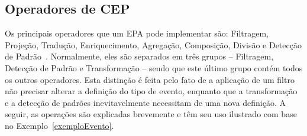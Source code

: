 
\subsection{Operadores de CEP}

\label{sec:CEPoperators}
Os principais operadores que um EPA pode implementar são: Filtragem, Projeção, Tradução, Enriquecimento, Agregação, Composição, Divisão e Detecção de Padrão~\citep{Etzion:2010:EPA:1894960}. Normalmente, eles são separados em três grupos -- Filtragem, Detecção de Padrão e Transformação -- sendo que este último grupo contém todos os outros operadores. Esta distinção é feita pelo fato de a aplicação de um filtro não precisar alterar a definição do tipo de evento, enquanto que a transformação e a detecção de padrões inevitavelmente necessitam de uma nova definição. A seguir, as operações são explicadas brevemente e têm seu uso ilustrado com base no Exemplo~\ref{exemploEvento}.%



